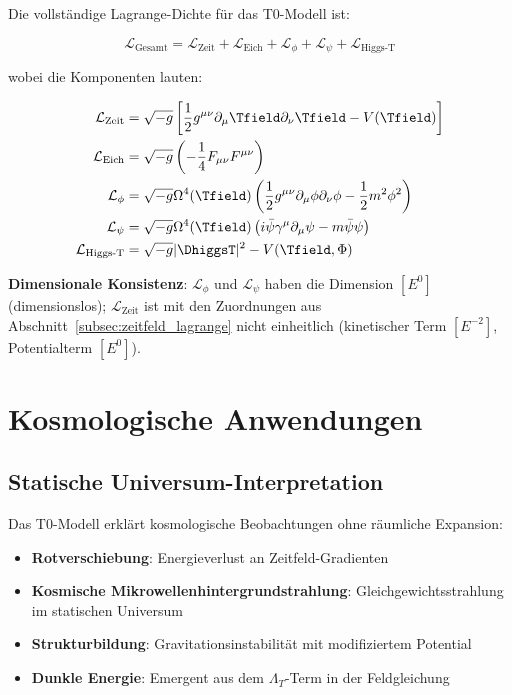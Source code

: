 	Die vollständige Lagrange-Dichte für das T0-Modell ist:
	
	\begin{equation}
		\mathcal{L}_{\text{Gesamt}} = \mathcal{L}_{\text{Zeit}} + \mathcal{L}_{\text{Eich}} + \mathcal{L}_{\phi} + \mathcal{L}_{\psi} + \mathcal{L}_{\text{Higgs-T}}
		\label{eq:gesamt_lagrange}
	\end{equation}
	
	wobei die Komponenten lauten:
	
	\begin{align}
		\mathcal{L}_{\text{Zeit}} &= \sqrt{-g} \left[\frac{1}{2} g^{\mu\nu} \partial_\mu \Tfield \partial_\nu \Tfield - V(\Tfield)\right] \\
		\mathcal{L}_{\text{Eich}} &= \sqrt{-g} \left(-\frac{1}{4} F_{\mu\nu} F^{\mu\nu}\right) \\
		\mathcal{L}_{\phi} &= \sqrt{-g} \Omega^4(\Tfield) \left(\frac{1}{2} g^{\mu\nu} \partial_\mu \phi \partial_\nu \phi - \frac{1}{2} m^2 \phi^2\right) \\
		\mathcal{L}_{\psi} &= \sqrt{-g} \Omega^4(\Tfield) \left(i\bar{\psi}\gamma^\mu\partial_\mu\psi - m\bar{\psi}\psi\right) \\
		\mathcal{L}_{\text{Higgs-T}} &= \sqrt{-g} |\DhiggsT|^2 - V(\Tfield, \Phi)
	\end{align}
	
	\textbf{Dimensionale Konsistenz}: $\mathcal{L}_{\phi}$ und $\mathcal{L}_{\psi}$ haben die Dimension $[E^0]$ (dimensionslos); $\mathcal{L}_{\text{Zeit}}$ ist mit den Zuordnungen aus Abschnitt~\ref{subsec:zeitfeld_lagrange} nicht einheitlich (kinetischer Term $[E^{-2}]$, Potentialterm $[E^0]$).
	
	\section{Kosmologische Anwendungen}
	\label{sec:kosmologische_anwendungen}
	

	

	\subsection{Statische Universum-Interpretation}
	\label{subsec:statisches_universum}
	
	Das T0-Modell erklärt kosmologische Beobachtungen ohne räumliche Expansion:
	\begin{itemize}
		\item \textbf{Rotverschiebung}: Energieverlust an Zeitfeld-Gradienten
		\item \textbf{Kosmische Mikrowellenhintergrundstrahlung}: Gleichgewichtsstrahlung im statischen Universum
		\item \textbf{Strukturbildung}: Gravitationsinstabilität mit modifiziertem Potential
		\item \textbf{Dunkle Energie}: Emergent aus dem $\Lambda_T$-Term in der Feldgleichung
	\end{itemize}
	
